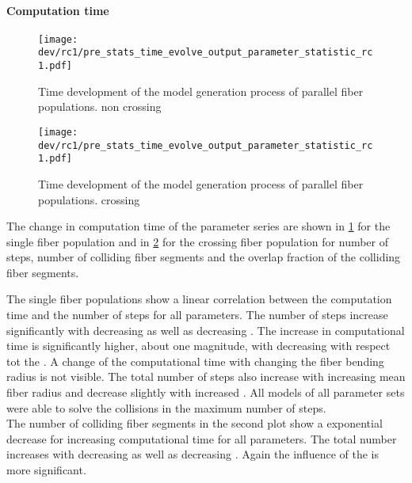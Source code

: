 \paragraph{Computation time}
% 
\begin{figure}[p]
\centering
\texttt{[image: dev/rc1/pre\_stats\_time\_evolve\_output\_parameter\_statistic\_rc1.pdf]}
\caption[Time development parallel]{Time development of the model generation process of parallel fiber populations. non crossing}
\label{fig:timeDevelopmentNone}
\end{figure}
% 
\begin{figure}[p]
\centering
\texttt{[image: dev/rc1/pre\_stats\_time\_evolve\_output\_parameter\_statistic\_rc1.pdf]}
\caption[Time development parallel]{Time development of the model generation process of parallel fiber populations. crossing }
\label{fig:timeDevelopmentCross}
\end{figure}
% 
The change in computation time of the parameter series are shown in \cref{fig:timeDevelopmentNone} for the single fiber population and in \cref{fig:timeDevelopmentCross} for the crossing fiber population for number of steps, number of colliding fiber segments and the overlap fraction of the colliding fiber segments.
\par
% 
The single fiber populations show a linear correlation between the computation time and the number of steps for all parameters.
The number of steps increase significantly with decreasing \segLengthFactor{} as well as decreasing \fiberRadiusMean{}.
The increase in computational time is significantly higher, about one magnitude, with decreasing \fiberRadiusMean{} with respect tot the \segLengthFactor{}.
A change of the computational time with changing the fiber bending radius \segRadiusFactor{} is not visible.
The total number of steps also increase with increasing mean fiber radius \fiberRadiusMean{} and decrease slightly with increased \segLengthFactor{}.
All models of all parameter sets were  able to solve the collisions in the maximum number of steps.
\\
The number of colliding fiber segments in the second plot show a exponential decrease for increasing computational time for all parameters.
The total number increases with decreasing \segLengthFactor{} as well as decreasing \fiberRadiusMean{}.
Again the influence of the \fiberRadiusMean{} is more significant.
